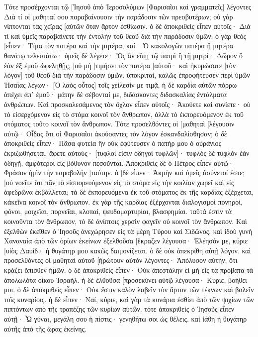 Τότε προσέρχονται τῷ [Ἰησοῦ ἀπὸ Ἱεροσολύμων [Φαρισαῖοι καὶ γραμματεῖς] λέγοντες 
Διὰ τί οἱ μαθηταί σου παραβαίνουσιν τὴν παράδοσιν τῶν πρεσβυτέρων; οὐ γὰρ νίπτονται τὰς χεῖρας [αὐτῶν ὅταν ἄρτον ἐσθίωσιν. 
ὁ δὲ ἀποκριθεὶς εἶπεν αὐτοῖς· Διὰ τί καὶ ὑμεῖς παραβαίνετε τὴν ἐντολὴν τοῦ θεοῦ διὰ τὴν παράδοσιν ὑμῶν; 
ὁ γὰρ θεὸς [εἶπεν· Τίμα τὸν πατέρα καὶ τὴν μητέρα, καί· Ὁ κακολογῶν πατέρα ἢ μητέρα θανάτῳ τελευτάτω· 
ὑμεῖς δὲ λέγετε· Ὃς ἂν εἴπῃ τῷ πατρὶ ἢ τῇ μητρί· Δῶρον ὃ ἐὰν ἐξ ἐμοῦ ὠφεληθῇς, 
[οὐ μὴ [τιμήσει τὸν πατέρα [αὐτοῦ· καὶ ἠκυρώσατε [τὸν λόγον] τοῦ θεοῦ διὰ τὴν παράδοσιν ὑμῶν. 
ὑποκριταί, καλῶς ἐπροφήτευσεν περὶ ὑμῶν Ἠσαΐας λέγων· 
[Ὁ λαὸς οὗτος] τοῖς χείλεσίν με τιμᾷ, ἡ δὲ καρδία αὐτῶν πόρρω ἀπέχει ἀπ᾽ ἐμοῦ· 
μάτην δὲ σέβονταί με, διδάσκοντες διδασκαλίας ἐντάλματα ἀνθρώπων. 
Καὶ προσκαλεσάμενος τὸν ὄχλον εἶπεν αὐτοῖς· Ἀκούετε καὶ συνίετε· 
οὐ τὸ εἰσερχόμενον εἰς τὸ στόμα κοινοῖ τὸν ἄνθρωπον, ἀλλὰ τὸ ἐκπορευόμενον ἐκ τοῦ στόματος τοῦτο κοινοῖ τὸν ἄνθρωπον. 
Τότε προσελθόντες οἱ [μαθηταὶ [λέγουσιν αὐτῷ· Οἶδας ὅτι οἱ Φαρισαῖοι ἀκούσαντες τὸν λόγον ἐσκανδαλίσθησαν; 
ὁ δὲ ἀποκριθεὶς εἶπεν· Πᾶσα φυτεία ἣν οὐκ ἐφύτευσεν ὁ πατήρ μου ὁ οὐράνιος ἐκριζωθήσεται. 
ἄφετε αὐτούς· [τυφλοί εἰσιν ὁδηγοί τυφλῶν]· τυφλὸς δὲ τυφλὸν ἐὰν ὁδηγῇ, ἀμφότεροι εἰς βόθυνον πεσοῦνται. 
Ἀποκριθεὶς δὲ ὁ Πέτρος εἶπεν αὐτῷ· Φράσον ἡμῖν τὴν παραβολήν [ταύτην. 
ὁ [δὲ εἶπεν· Ἀκμὴν καὶ ὑμεῖς ἀσύνετοί ἐστε; 
[οὐ νοεῖτε ὅτι πᾶν τὸ εἰσπορευόμενον εἰς τὸ στόμα εἰς τὴν κοιλίαν χωρεῖ καὶ εἰς ἀφεδρῶνα ἐκβάλλεται; 
τὰ δὲ ἐκπορευόμενα ἐκ τοῦ στόματος ἐκ τῆς καρδίας ἐξέρχεται, κἀκεῖνα κοινοῖ τὸν ἄνθρωπον. 
ἐκ γὰρ τῆς καρδίας ἐξέρχονται διαλογισμοὶ πονηροί, φόνοι, μοιχεῖαι, πορνεῖαι, κλοπαί, ψευδομαρτυρίαι, βλασφημίαι. 
ταῦτά ἐστιν τὰ κοινοῦντα τὸν ἄνθρωπον, τὸ δὲ ἀνίπτοις χερσὶν φαγεῖν οὐ κοινοῖ τὸν ἄνθρωπον. 
Καὶ ἐξελθὼν ἐκεῖθεν ὁ Ἰησοῦς ἀνεχώρησεν εἰς τὰ μέρη Τύρου καὶ Σιδῶνος. 
καὶ ἰδοὺ γυνὴ Χαναναία ἀπὸ τῶν ὁρίων ἐκείνων ἐξελθοῦσα [ἔκραζεν λέγουσα· Ἐλέησόν με, κύριε [υἱὸς Δαυίδ· ἡ θυγάτηρ μου κακῶς δαιμονίζεται. 
ὁ δὲ οὐκ ἀπεκρίθη αὐτῇ λόγον. καὶ προσελθόντες οἱ μαθηταὶ αὐτοῦ [ἠρώτουν αὐτὸν λέγοντες· Ἀπόλυσον αὐτήν, ὅτι κράζει ὄπισθεν ἡμῶν. 
ὁ δὲ ἀποκριθεὶς εἶπεν· Οὐκ ἀπεστάλην εἰ μὴ εἰς τὰ πρόβατα τὰ ἀπολωλότα οἴκου Ἰσραήλ. 
ἡ δὲ ἐλθοῦσα [προσεκύνει αὐτῷ λέγουσα· Κύριε, βοήθει μοι. 
ὁ δὲ ἀποκριθεὶς εἶπεν· Οὐκ ἔστιν καλὸν λαβεῖν τὸν ἄρτον τῶν τέκνων καὶ βαλεῖν τοῖς κυναρίοις. 
ἡ δὲ εἶπεν· Ναί, κύριε, καὶ γὰρ τὰ κυνάρια ἐσθίει ἀπὸ τῶν ψιχίων τῶν πιπτόντων ἀπὸ τῆς τραπέζης τῶν κυρίων αὐτῶν. 
τότε ἀποκριθεὶς ὁ Ἰησοῦς εἶπεν αὐτῇ· Ὦ γύναι, μεγάλη σου ἡ πίστις· γενηθήτω σοι ὡς θέλεις. καὶ ἰάθη ἡ θυγάτηρ αὐτῆς ἀπὸ τῆς ὥρας ἐκείνης. 
